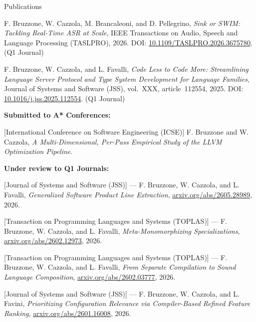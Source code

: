 \documentclass[
	aspectratio=169, %
]{beamer}
\begin{document}
\begin{frame}{Publications}
\tiny

F. Bruzzone, W. Cazzola, M. Brancaleoni, and D. Pellegrino, \textit{Sink or SWIM: Tackling Real-Time ASR at Scale}, IEEE Transactions on Audio, Speech and Language Processing (TASLPRO), 2026.  DOI: \href{https://doi.org/10.1109/TASLPRO.2026.3675780}{10.1109/TASLPRO.2026.3675780}.  (Q1 Journal)

F. Bruzzone, W. Cazzola, and L. Favalli, \textit{Code Less to Code More: Streamlining Language Server Protocol and Type System Development for Language Families}, Journal of Systems and Software (JSS), vol.~XXX, article~112554, 2025.  DOI: \href{https://doi.org/10.1016/j.jss.2025.112554}{10.1016/j.jss.2025.112554}.  (Q1 Journal)

\textbf{Submitted to A* Conferences:}

[International Conference on Software Engineering (ICSE)] F. Bruzzone and W. Cazzola, \textit{A Multi-Dimensional, Per-Pass Empirical Study of the LLVM Optimization Pipeline}.

\textbf{Under review to Q1 Journals:}

[Journal of Systems and Software (JSS)] --- F. Bruzzone, W. Cazzola, and L. Favalli, \textit{Generalized Software Product Line Extraction},  \href{https://arxiv.org/abs/2605.28989}{arxiv.org/abs/2605.28989}, 2026.

[Transaction on Programming Languages and Systems (TOPLAS)] --- F. Bruzzone, W. Cazzola, and L. Favalli, \textit{Meta-Monomorphizing Specializations}, \href{https://arxiv.org/abs/2602.12973}{arxiv.org/abs/2602.12973}, 2026.

[Transaction on Programming Languages and Systems (TOPLAS)] --- F. Bruzzone, W. Cazzola, and L. Favalli, \textit{From Separate Compilation to Sound Language Composition}, \href{https://arxiv.org/abs/2602.03777}{arxiv.org/abs/2602.03777}, 2026.

[Journal of Systems and Software (JSS)] --- F. Bruzzone, W. Cazzola, and L. Favini, \textit{Prioritizing Configuration Relevance via Compiler-Based Refined Feature Ranking}, \href{https://arxiv.org/abs/2601.16008}{arxiv.org/abs/2601.16008}, 2026.

\end{frame}
\end{document}

